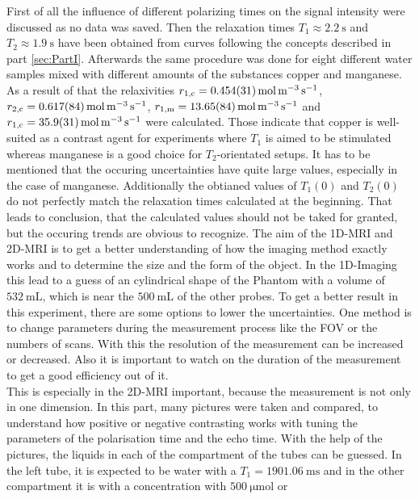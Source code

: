 First of all the influence of different polarizing times on the signal intensity were discussed as no data was saved. Then the relaxation times $T_1 \approx \SI{2.2}{\second}$ and $T_2 \approx \SI{1.9}{\second}$ have been obtained from curves following the concepts described in part \ref{sec:PartI}. Afterwards the same procedure was done for eight different water samples mixed with different amounts of the substances copper and manganese. As a result of that the relaxivities $r_{\text{1,c}} = \SI{0.454 \pm 0.031}{\mole \per \metre \tothe{3} \per \second}$, $r_{\text{2,c}} = \SI{0.617 \pm 0.084}{\mole \per \metre \tothe{3} \per \second}$, $r_{\text{1,m}} = \SI{13.65 \pm 0.84}{\mole \per \metre \tothe{3} \per \second}$ and $r_{\text{1,c}} = \SI{35.9 \pm 3.1}{\mole \per \metre \tothe{3} \per \second}$ were calculated. 
Those indicate that copper is well-suited as a contrast agent for experiments where $T_1$ is aimed to be stimulated whereas manganese is a good choice for $T_2$-orientated setups.
It has to be mentioned that the occuring uncertainties have quite large values, especially in the case of manganese.
Additionally the obtianed values of $T_1(0)$ and $T_2(0)$ do not perfectly match the relaxation times calculated at the beginning.
That leads to conclusion, that the calculated values should not be taked for granted, but the occuring trends are obvious to recognize.
The aim of the 1D-MRI and 2D-MRI is to get a better understanding of how the imaging method exactly works and to determine the size and the form of the object. In the 1D-Imaging this lead to a guess of an cylindrical shape of the Phantom with a volume of $\SI{532}{\milli\liter}$, which is near the $\SI{500}{\milli\liter}$ of the other probes. To get a better result in this experiment, there are some options to lower the uncertainties. One method is to change parameters during the measurement process like the FOV or the numbers of scans. With this the resolution of the measurement can be increased or decreased. Also it is important to watch on the duration of the measurement to get a good efficiency out of it. \\
This is especially in the 2D-MRI important, because the measurement is not only in one dimension. In this part, many pictures were taken and compared, to understand how positive or negative contrasting works with tuning the parameters of the polarisation time and the echo time. With the help of the pictures, the liquids in each of the compartment of the tubes can be guessed. In the left tube, it is expected to be water with a $T_1=\SI{1901,06}{\milli\s}$ and in the other compartment it is  with a concentration with $\SI{500}{\micro\mole}$ or 
